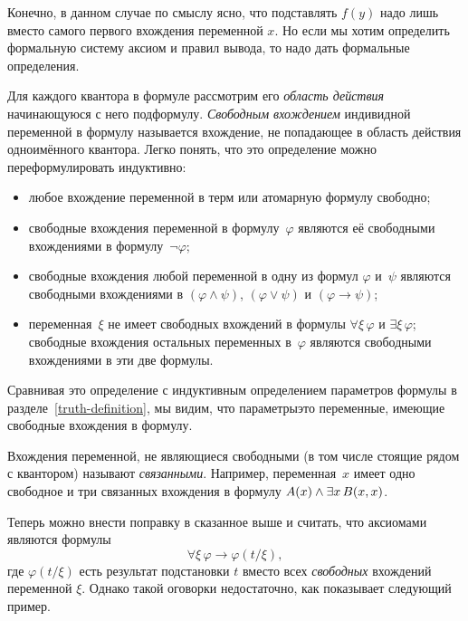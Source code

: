 Конечно, в данном случае по смыслу ясно, что подставлять $f(y)$
надо лишь вместо самого первого вхождения переменной $x$. Но
если мы хотим определить формальную систему аксиом и правил
вывода, то надо дать формальные определения.

Для каждого квантора в формуле рассмотрим его \emph{область действия}%
%
%
\т начинающуюся с него подформулу. \emph{Свободным
вхождением}%
%
индивидной переменной в формулу называется
вхождение, не попадающее в область действия одноимённого
квантора. Легко понять, что это определение можно
переформулировать индуктивно:
\begin{itemize}
        \item
любое вхождение переменной в терм или атомарную формулу
свободно;
        \item
свободные вхождения переменной в формулу~$\varphi$ яв\-ля\-ют\-ся её
свободными вхождениями в формулу~$\lnot \varphi$;
        \item
свободные вхождения любой переменной в одну из формул $\varphi$
и~$\psi$ являются свободными вхождениями в $(\varphi\land\psi)$,
$(\varphi\lor\psi)$ и $(\varphi\to\psi)$;
        \item
переменная~$\xi$ не имеет свободных вхождений в формулы $\forall
\xi\, \varphi$ и $\exists \xi\,\varphi$; свободные вхождения
остальных переменных в~$\varphi$ являются свободными вхождениями
в эти две формулы.
\end{itemize}

Сравнивая это определение с индуктивным определением
параметров формулы в разделе~\ref{truth-definition}, мы
видим, что параметры\т это переменные, имеющие свободные
вхождения в формулу.

Вхождения переменной, не являющиеся свободными (в том числе
стоящие рядом с квантором) называют \emph{связанными}.%
%
Например,
переменная~$x$ имеет одно свободное и три связанных вхождения в
формулу $A(x)\hm\land \exists x\,B(x,x)$.

Теперь можно внести поправку в сказанное выше и
считать, что аксиомами являются формулы
        $$
\forall\xi\, \varphi \to \varphi(t/\xi),
        $$
где $\varphi(t/\xi)$ есть результат подстановки $t$ вместо всех
\textsl{свободных} вхождений переменной $\xi$. Однако такой
оговорки недостаточно, как показывает следующий пример.

